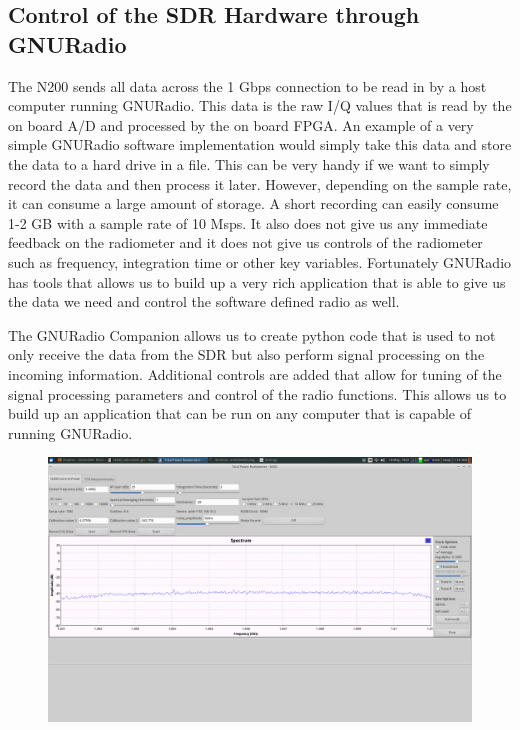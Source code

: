 \subsection{Control of the SDR Hardware through GNURadio}
The N200 sends all data across the 1 Gbps connection to be read in by a host computer running GNURadio.  This data is the raw I/Q values that is read by the on board A/D and processed by the on board FPGA.  An example of a very simple GNURadio software implementation would simply take this data and store the data to a hard drive in a file.  This can be very handy if we want to simply record the data and then process it later.  However, depending on the sample rate, it can consume a large amount of storage.  A short recording can easily consume 1-2 GB with a sample rate of 10 Msps.  It also does not give us any immediate feedback on the radiometer and it does not give us controls of the radiometer such as frequency, integration time or other key variables.  Fortunately GNURadio has tools that allows us to build up a very rich application that is able to give us the data we need and control the software defined radio as well.

The GNURadio Companion allows us to create python code that is used to not only receive the data from the SDR but also perform signal processing on the incoming information.  Additional controls are added that allow for tuning of the signal processing parameters and control of the radio functions.  This allows us to build up an application that can be run on any computer that is capable of running GNURadio.  

{\begin{figure}[h!tb] 
\centering
\includegraphics[width=17cm]{Images/radiometer_gui.png}
\label{radiometer_gui}
\end{figure}
}

